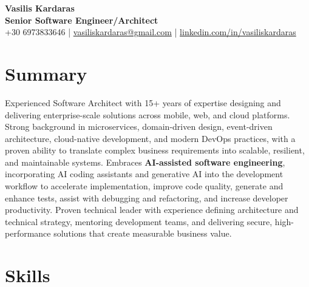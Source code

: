 \documentclass{mycv}
\begin{document}
\begin{center}
    {\LARGE\bfseries Vasilis Kardaras}\\
    \vspace{0.3em}
    {\large \textbf{Senior Software Engineer/Architect}}\\
    \vspace{0.3em}
    +30 6973833646 \enspace|\enspace
    \href{mailto:vasiliskardaras@yyyyyyyyyyygmail.com}{vasiliskardaras@gmail.com}
    \enspace|\enspace
    \href{https://linkedin.com/in/vasiliskardaras}
    {linkedin.com/in/vasiliskardaras}
\end{center}

\section*{Summary}
\vspace{0.5em}
Experienced Software Architect with 15+ years of expertise designing and delivering enterprise-scale solutions across mobile, web, and cloud platforms. Strong background in microservices, domain-driven design, event-driven architecture, cloud-native development, and modern DevOps practices, with a proven ability to translate complex business requirements into scalable, resilient, and maintainable systems. Embraces \textbf{AI-assisted software engineering}, incorporating AI coding assistants and generative AI into the development workflow to accelerate implementation, improve code quality, generate and enhance tests, assist with debugging and refactoring, and increase developer productivity. Proven technical leader with experience defining architecture and technical strategy, mentoring development teams, and delivering secure, high-performance solutions that create measurable business value.


\section*{Skills}
\end{document}

